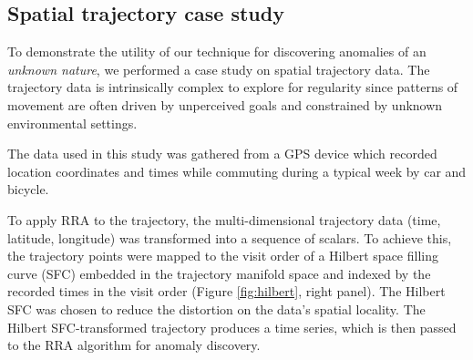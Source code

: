 \documentclass{sig-alternate}
\begin{document}
\subsection{Spatial trajectory case study}
To demonstrate the utility of our technique for discovering anomalies of an \textit{unknown nature}, we performed a case study on spatial trajectory data. The trajectory data is intrinsically complex to explore for regularity since patterns of movement are often driven by unperceived goals and constrained by unknown environmental settings. 

The data used in this study was gathered from a GPS device which recorded location coordinates and times while commuting during a typical week by car and bicycle. 

To apply RRA to the trajectory, the multi-dimensional trajectory data (time, latitude, longitude) was transformed into a sequence of scalars. To achieve this, the trajectory points were mapped to the visit order of a Hilbert space filling curve (SFC) \cite{hilbert} embedded in the trajectory manifold space and indexed by the recorded times in the visit order (Figure \ref{fig:hilbert}, right panel). The Hilbert SFC was chosen to reduce the distortion on the data's spatial locality. The Hilbert SFC-transformed trajectory produces a time series, which is then passed to the RRA algorithm for anomaly discovery.
\end{document}
